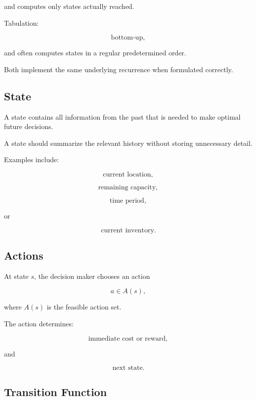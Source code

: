 and computes only states actually reached.

Tabulation:

\[
\boxed{
\text{bottom-up},
}
\]

and often computes states in a regular predetermined order.

Both implement the same underlying recurrence when formulated correctly.

\subsection{State}
\label{subsec:dynamic-programming-state}

A state contains all information from the past that is needed to make
optimal future decisions.

A state should summarize the relevant history without storing unnecessary
detail.

Examples include:

\[
\boxed{
\text{current location},
}
\]

\[
\boxed{
\text{remaining capacity},
}
\]

\[
\boxed{
\text{time period},
}
\]

or

\[
\boxed{
\text{current inventory}.
}
\]

\subsection{Actions}
\label{subsec:dynamic-programming-actions}

At state \(s\), the decision maker chooses an action

\[
\boxed{
a\in A(s),
}
\]

where \(A(s)\) is the feasible action set.

The action determines:

\[
\boxed{
\text{immediate cost or reward},
}
\]

and

\[
\boxed{
\text{next state}.
}
\]

\subsection{Transition Function}
\label{subsec:dynamic-programming-transition}

